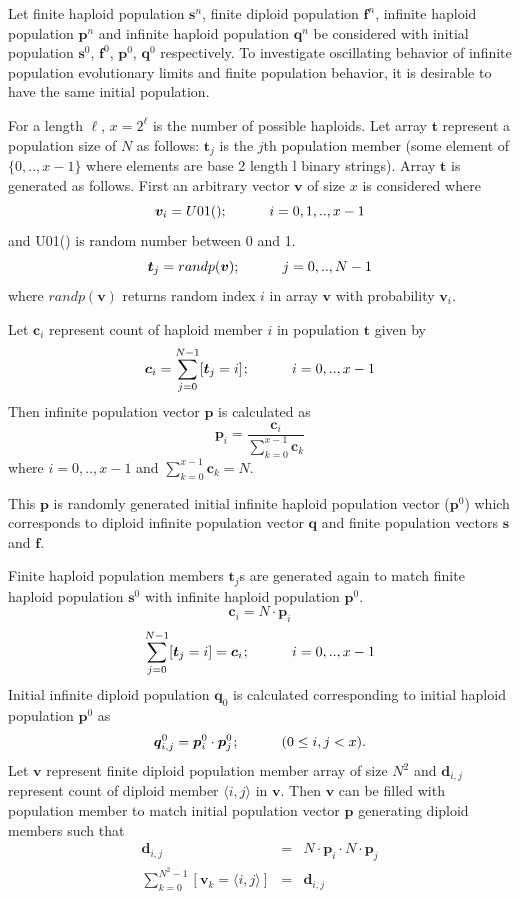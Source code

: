 Let finite haploid population $\bm{s}^n$, finite diploid population $\bm{f}^n$, infinite haploid population $\bm{p}^n$ 
and infinite haploid population $\bm{q}^n$ be considered with initial population $\bm{s}^0$, $\bm{f}^0$,
$\bm{p}^0$, $\bm{q}^0$ respectively. To investigate oscillating behavior of infinite population evolutionary limits 
and finite population behavior, it is desirable to have the same initial population. 

For a length $\ell$, $x = 2^\ell$ is the number of possible haploids. Let array $\bm{t}$ represent a  
population size of $N$ as follows: $\bm{t}_j$ is the $j$th population member (some element of $\{0,..,x-1\}$ 
where elements are base 2 length l binary strings). Array $\bm{t}$ is generated as follows. 
First an arbitrary vector $\bm{v}$ of size $x$ is considered where
\[
\bm{v}_i = U01(); \hspace{30pt} {i = 0, 1,.., x-1}
\]
and U01() is random number between 0 and 1.
\[
\bm{t}_j = randp(\bm{v}) ; \hspace{30pt} {j = 0,.., N-1}
\]
where $randp(\bm{v})$ returns random index $i$ in array $\bm{v}$ with probability $\bm{v}_i$.

Let $\bm{c}_i$ represent count of haploid member $i$ in population $\bm{t}$ given by
\[
\bm{c}_i = \sum \limits_{j=0}^{N-1} [\bm{t}_j = i]  \hspace{0.01in}; \hspace{30pt}  {i = 0,.., x-1}
\]
Then infinite population vector $\bm{p}$ is calculated as
\[
\bm{p}_i = \frac{\bm{c}_i}{ \sum \limits_{k=0}^{x-1} \bm{c}_k }
\]
where $i = 0,.., x-1$ and $\sum \limits_{k=0}^{x-1} \bm{c}_k = N$.

This $\bm{p}$ is randomly generated initial infinite haploid population vector ($\bm{p}^0$) which corresponds to diploid infinite population vector $\bm{q}$ 
and finite population vectors $\bm{s}$ and $\bm{f}$.

Finite haploid population members $\bm{t}_j$s are generated again to match finite haploid population $\bm{s}^0$ with infinite haploid population $\bm{p}^0$.
\[
\bm{c}_i = N \cdot \bm{p}_i 
\]
\[
\sum \limits_{j=0}^{N-1} [\bm{t}_j = i] = \bm{c}_i  \hspace{0.01in}; \hspace{30pt}  {i = 0,.., x-1} 
\]
Initial infinite diploid population $\bm{q}_0$ is calculated corresponding to initial haploid population $\bm{p}^0$ as
\[
\bm{q}^0_{i,j} = \bm{p}^0_i \cdot \bm{p}^0_j  \hspace{0.01in}; \hspace{30pt}  (0 \leq i,j < x).
\]
Let $\bm{v}$ represent finite diploid population member array of size $N^2$ and $\bm{d}_{i,j}$ represent count of 
diploid member $\langle i,j \rangle$ in $\bm{v}$. Then $\bm{v}$ can be filled with population member to match 
initial population vector $\bm{p}$ generating diploid members such that
\begin{eqnarray*}
\bm{d}_{i,j} & = & N \cdot \bm{p}_i \cdot N \cdot \bm{p}_j  \\
\sum \limits_{k=0}^{N^2-1} [ \bm{v}_k = \langle i,j \rangle ] & = & \bm{d}_{i,j}
\end{eqnarray*}

